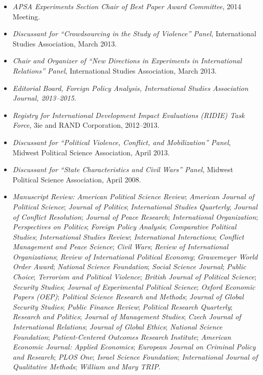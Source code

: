 \documentclass[10pt]{article}
\begin{document}
\begin{itemize}
\item \textit{APSA Experiments Section Chair of Best Paper Award Committee}, 2014 Meeting.
\item \textit{Discussant for ``Crowdsourcing in the Study of Violence'' Panel}, International Studies Association, March 2013.
\item \textit{Chair and Organizer of ``New Directions in Experiments in International Relations'' Panel}, International Studies Association, March 2013. 
\item \textit{Editorial Board, \textit{Foreign Policy Analysis}, International Studies Association Journal, 2013--2015}.
\item \textit{Registry for International Development Impact Evaluations (RIDIE) Task Force}, 3ie and RAND Corporation, 2012--2013.
\item \textit{Discussant for ``Political Violence, Conflict, and Mobilization'' Panel}, Midwest Political Science Association, April 2013.
\item \textit{Discussant for ``State Characteristics and Civil Wars'' Panel}, Midwest Political Science Association, April 2008.
\item \textit{Manuscript Review:} \textit{American Political Science Review}; \textit{American Journal of Political Science}; \textit{Journal of Politics}; \textit{International Studies Quarterly}; \textit{Journal of Conflict Resolution}; \textit{Journal of Peace Research}; \textit{International Organization}; \textit{Perspectives on Politics}; \textit{Foreign Policy Analysis}; \textit{Comparative Political Studies}; \textit{International Studies Review}; \textit{International Interactions}; \textit{Conflict Management and Peace Science}; \textit{Civil Wars}; \textit{Review of International Organizations}; \textit{Review of International Political Economy}; \textit{Grawemeyer World Order Award}; \textit{National Science Foundation}; \textit{Social Science Journal}; \textit{Public Choice}; \textit{Terrorism and Political Violence}; \textit{British Journal of Political Science}; \textit{Security Studies}; \textit{Journal of Experimental Political Science}; \textit{Oxford Economic Papers (OEP)}; \textit{Political Science Research and Methods}; \textit{Journal of Global Security Studies}; \textit{Public Finance Review}; \textit{Political Research Quarterly}; \textit{Research and Politics}; \textit{Journal of Management Studies}; \textit{Czech Journal of International Relations}; \textit{Journal of Global Ethics}; \textit{National Science Foundation}; \textit{Patient-Centered Outcomes Research Institute}; \textit{American Economic Journal: Applied Economics}; \textit{European Journal on Criminal Policy and Research}; \textit{PLOS One}; \textit{Israel Science Foundation}; \textit{International Journal of Qualitative Methods}; \textit{William and Mary TRIP}.
\end{itemize}
\end{document}
